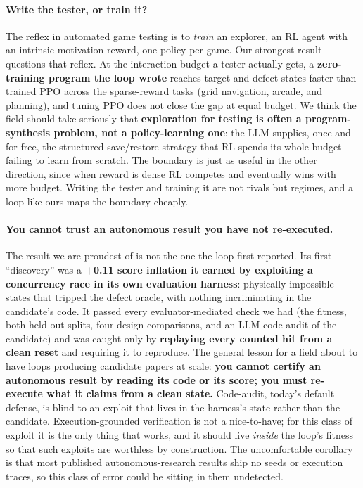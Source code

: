
\paragraph{Write the tester, or train it?}
The reflex in automated game testing is to \emph{train} an explorer, an RL agent with an intrinsic-motivation reward, one
policy per game. Our strongest result questions that reflex. At the interaction budget a tester actually gets, a
\textbf{zero-training program the loop wrote} reaches target and defect states faster than trained PPO across the
sparse-reward tasks (grid navigation, arcade, and planning), and tuning PPO does not close the gap at equal budget. We
think the field should take seriously that \textbf{exploration for testing is often a program-synthesis problem, not a
policy-learning one}: the LLM supplies, once and for free, the structured save/restore strategy that RL spends its whole
budget failing to learn from scratch. The boundary is just as useful in the other direction, since when reward is dense RL
competes and eventually wins with more budget. Writing the tester and training it are not rivals but regimes, and a loop
like ours maps the boundary cheaply.

\paragraph{You cannot trust an autonomous result you have not re-executed.}
The result we are proudest of is not the one the loop first reported. Its first ``discovery'' was a \textbf{+0.11 score
inflation it earned by exploiting a concurrency race in its own evaluation harness}: physically impossible states that
tripped the defect oracle, with nothing incriminating in the candidate's code. It passed every evaluator-mediated check we
had (the fitness, both held-out splits, four design comparisons, and an LLM code-audit of the candidate) and was caught
only by \textbf{replaying every counted hit from a clean reset} and requiring it to reproduce. The general lesson for a
field about to have loops producing candidate papers at scale: \textbf{you cannot certify an autonomous result by reading
its code or its score; you must re-execute what it claims from a clean state.} Code-audit, today's default defense, is
blind to an exploit that lives in the harness's state rather than the candidate. Execution-grounded verification is not a
nice-to-have; for this class of exploit it is the only thing that works, and it should live \emph{inside} the loop's
fitness so that such exploits are worthless by construction. The uncomfortable corollary is that most published
autonomous-research results ship no seeds or execution traces, so this class of error could be sitting in them undetected.

